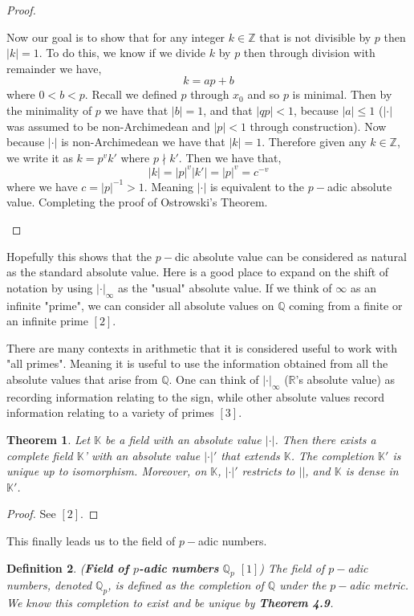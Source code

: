 \documentclass[12pt]{article}
\newtheorem{thm}{Theorem}[section]
\newtheorem{mydef}[thm]{Definition}
\theoremstyle{definition}
\theoremstyle{remark}
\newcommand{\zz}{\mathbb Z}   %
\newcommand{\qq}{\mathbb Q}   %
\newcommand{\rr}{\mathbb R}   %
\newcommand{\abs}[1]{\left\lvert#1\right\rvert} %
\renewcommand{\leq}{\leqslant}
\newcommand{\lrb}[1]{\left[#1\right]}
\begin{document}
\begin{proof}
\begin{itemize}
        Now our goal is to show that for any integer $k\in\zz$ that is not divisible by $p$ then $\abs{k} = 1$. To do this, we know if we divide $k$ by $p$ then through division with remainder we have,
        \[k= ap + b\]
        where $0 < b < p$. Recall we defined $p$ through $x_0$ and so $p$ is minimal. Then by the minimality of $p$ we have that $\abs{b} = 1$, and that $\abs{qp} < 1$, because $\abs{a} \leq 1$ ($\abs{\cdot}$ was assumed to be non-Archimedean and $\abs{p} < 1$ through construction). Now because $\abs{\cdot}$ is non-Archimedean we have that $\abs{k} = 1$. Therefore given any $k\in \zz$, we write it as $k = p^{v }k'$ where $p\nmid k'$. Then we have that,
        \[\abs{k} = \abs{p}^{v}\abs{k'} = \abs{p}^{v} = c^{-v}\]
        where we have $c= \abs{p}^{-1} > 1$. Meaning $\abs{\cdot}$ is equivalent to the $p-$adic absolute value. Completing the proof of Ostrowski's Theorem.
      \end{itemize}
    \end{proof}

    Hopefully this shows that the $p-$dic absolute value can be considered as natural as the standard absolute value. Here is a good place to expand on the shift of notation by using $\abs{\cdot}_\infty$ as the "usual" absolute value. If we think of $\infty$ as an infinite "prime", we can consider all absolute values on $\qq$ coming from a finite or an infinite prime $\lrb{2}$. 

    There are many contexts in arithmetic that it is considered useful to work with "all primes". Meaning it is useful to use the information obtained from all the absolute values that arise from $\qq$. One can think of $\abs{\cdot}_\infty$ ($\rr$'s absolute value) as recording information relating to the sign, while other absolute values record information relating to a variety of primes $\lrb{3}$. 

    \begin{thm} Let $\mathbb{K}$ be a field with an absolute value $\abs{\cdot}$. Then there exists a complete field $\mathbb{K}$' with an absolute value $\abs{\cdot}'$ that extends $\mathbb{K}$. The completion $\mathbb{K}'$ is unique up to isomorphism. Moreover, on $\mathbb{K}$, $\abs{\cdot}'$ restricts to $\abs{}$, and $\mathbb{K}$ is dense in $\mathbb{K}'$.
    \end{thm}
    \begin{proof}
      See $\lrb{2}$.
    \end{proof}

    This finally leads us to the field of $p-$adic numbers.
    \begin{mydef} (\textbf{Field of $p$-adic numbers} $\qq_p$ $\lrb{1}$) The field of $p-$adic numbers, denoted $\qq_p$, is defined as the completion of $\qq$ under the $p-$adic metric. We know this completion to exist and be unique by \textbf{Theorem 4.9}.
    \end{mydef}
\end{document}
